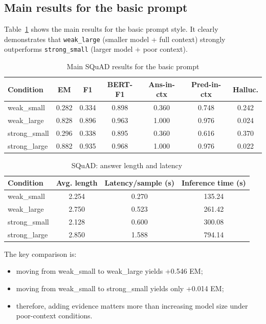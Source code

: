\documentclass[a4paper,12pt]{article}
\begin{document}
\subsection{Main results for the basic prompt}
Table~\ref{tab:squad_basic} shows the main results for the basic prompt style. It clearly demonstrates that \texttt{weak\_large} (smaller model + full context) strongly outperforms \texttt{strong\_small} (larger model + poor context).

\begin{table}[H]
\centering
\caption{Main SQuAD results for the basic prompt}
\label{tab:squad_basic}
\begin{tabular}{|l|c|c|c|c|c|c|}
\hline
Condition & EM & F1 & BERT-F1 & Ans-in-ctx & Pred-in-ctx & Halluc. \\
\hline
weak\_small & 0.282 & 0.334 & 0.898 & 0.360 & 0.748 & 0.242 \\
weak\_large & 0.828 & 0.896 & 0.963 & 1.000 & 0.976 & 0.024 \\
strong\_small & 0.296 & 0.338 & 0.895 & 0.360 & 0.616 & 0.370 \\
strong\_large & 0.882 & 0.935 & 0.968 & 1.000 & 0.976 & 0.022 \\
\hline
\end{tabular}
\end{table}

\begin{table}[H]
\centering
\caption{SQuAD: answer length and latency}
\begin{tabular}{|l|c|c|c|}
\hline
Condition & Avg. length & Latency/sample (s) & Inference time (s) \\
\hline
weak\_small & 2.254 & 0.270 & 135.24 \\
weak\_large & 2.750 & 0.523 & 261.42 \\
strong\_small & 2.128 & 0.600 & 300.08 \\
strong\_large & 2.850 & 1.588 & 794.14 \\
\hline
\end{tabular}
\end{table}

The key comparison is:
\begin{itemize}
    \item moving from weak\_small to weak\_large yields +0.546 EM;
    \item moving from weak\_small to strong\_small yields only +0.014 EM;
    \item therefore, adding evidence matters more than increasing model size under poor-context conditions.
\end{itemize}
\end{document}

